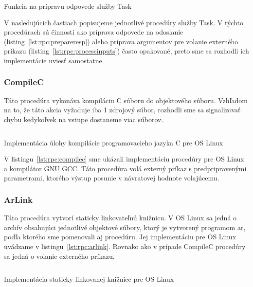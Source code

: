 \begin{listing}[H]
  \inputminted[frame=lines,framesep=2mm,linenos,fontsize=\scriptsize,firstline=24,lastline=40]{go}{/home/pepol/src/imterra/forge/worker/tasks/util.go}
  \caption{Funkcia na prípravu odpovede služby Task}
  \label{lst:rpc:prepareresp}
\end{listing}

V nasledujúcich častiach popisujeme jednotlivé procedúry služby Task. V týchto
procedúrach sú činnosti ako príprava odpovede na odoslanie (listing~\ref{lst:rpc:prepareresp})
alebo príprava argumentov pre volanie externého príkazu (listing~\ref{lst:rpc:processinputs})
často opakované, preto sme sa rozhodli ich implementácie uviesť samostatne.

\subsubsection{CompileC}

Táto procedúra vykonáva kompiláciu C súboru do objektového súboru. Vzhľadom na to,
že táto akcia vyžaduje iba 1 zdrojový súbor, rozhodli sme sa signalizovať chybu
kedykoľvek na vstupe dostaneme viac súborov.

\begin{listing}[H]
  \inputminted[frame=lines,framesep=2mm,linenos,fontsize=\scriptsize,firstline=20,lastline=47]{go}{/home/pepol/src/imterra/forge/worker/tasks/tasks.go}
  \caption[Implementácia kompilácie jazyka C]{Implementácia úlohy kompilácie programovacieho jazyka C pre OS Linux}
  \label{lst:rpc:compilec}
\end{listing}

V listingu~\ref{lst:rpc:compilec} sme ukázali implementáciu procedúry pre OS Linux
a kompilátor GNU GCC\@. Táto procedúra volá externý príkaz s predpripravenými parametrami,
ktorého výstup posunie v návratovej hodnote volajúcemu.

\subsubsection{ArLink}

Táto procedúra vytvorí staticky linkovateľnú knižnicu. V OS Linux sa jedná o archív
obsahujúci jednotlivé objektové súbory, ktorý je vytvorený programom ar, podľa ktorého
sme pomenovali aj procedúru. Jej implementáciu pre OS Linux uvádzame v listingu~\ref{lst:rpc:arlink}.
Rovnako ako v prípade CompileC procedúry sa jedná o volanie externého príkazu.

\begin{listing}[H]
  \inputminted[frame=lines,framesep=2mm,linenos,fontsize=\scriptsize,firstline=49,lastline=72]{go}{/home/pepol/src/imterra/forge/worker/tasks/tasks.go}
  \caption{Implementácia staticky linkovanej knižnice pre OS Linux}
  \label{lst:rpc:arlink}
\end{listing}

